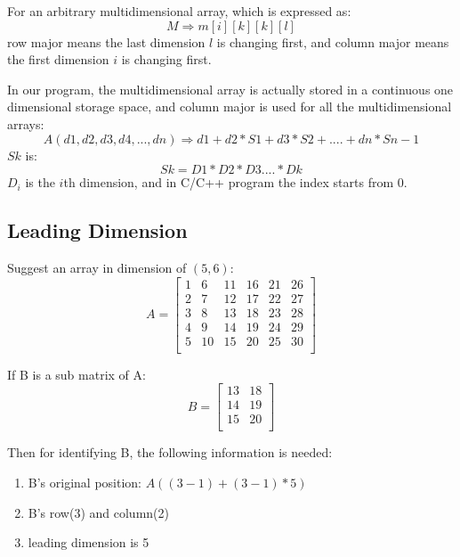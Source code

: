 For an arbitrary multidimensional array, which is expressed as:
\begin{equation}
 M \Rightarrow  m[i][k][k][l]
\end{equation} 
row major means the last dimension $l$ is changing first, and column 
major means the first dimension $i$ is changing first.

In our program, the multidimensional array is actually stored in a
continuous one dimensional storage space, and column major is used 
for all the multidimensional arrays:
\begin{equation}
 A(d1,d2,d3,d4,...,dn) \Rightarrow d1+d2*S1+d3*S2+....+dn*Sn-1
\end{equation} 
$Sk$ is:
\begin{equation}
 Sk=D1*D2*D3....*Dk
\end{equation} 
$D_{i}$ is the $i$th dimension, and in C/C++ program the index starts from 0.

\subsection{Leading Dimension}
%
%
Suggest an array in dimension of $(5,6)$:
\begin{equation}
A = 
\begin{bmatrix}
1 &  6  &  11 &  16 &  21 &  26 \\ 
2 &  7  &  12 &  17 &  22 &  27 \\
3 &  8  &  13 &  18 &  23 &  28 \\
4 &  9  &  14 &  19 &  24 &  29 \\
5 &  10 &  15 &  20 &  25 &  30 \\
\end{bmatrix}
\end{equation} 

If B is a sub matrix of A:
\begin{equation}
B = 
\begin{bmatrix}
13 & 18 \\ 
14 & 19 \\ 
15 & 20 \\ 
\end{bmatrix}
\end{equation} 

Then for identifying B, the following information is needed:
\begin{enumerate}
	\item  B's original position: $A((3-1)+(3-1)*5)$
	\item  B's row(3) and column(2)
	\item  leading dimension is 5
\end{enumerate}


